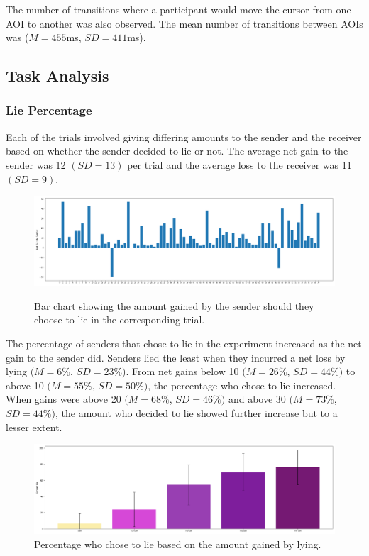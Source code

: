 \documentclass[man, floatsintext]{apa7}
\begin{document}
The number of transitions where a participant would move the cursor from one AOI to another was also observed. The mean number of transitions between AOIs was ($M = 455$ms, $SD = 411$ms).


\subsection{Task Analysis}

\subsubsection{Lie Percentage}

Each of the trials involved giving differing amounts to the sender and the receiver based on whether the sender decided to lie or not. The average net gain to the sender was 12 $(SD = 13)$ per trial and the average loss to the receiver was 11 $(SD = 9)$.

\begin{figure}[H]
	\caption{Bar chart showing the amount gained by the sender should they choose to lie in the corresponding trial.}
	\includegraphics[width=\linewidth]{../plots/TrialIndex/Gains.png}
	\label{fig:Gains}
\end{figure}

The percentage of senders that chose to lie in the experiment increased as the net gain to the sender did.  Senders lied the least when they incurred a net loss by lying $(M = 6\%$, $SD = 23\%)$. From net gains below 10 $(M = 26\%$, $SD = 44\%)$ to above 10 $(M = 55\%$, $SD = 50\%)$, the percentage who chose to lie increased. When gains were above 20 $(M = 68\%$, $SD = 46\%)$ and above 30 $(M = 73\%$, $SD = 44\%)$, the amount who decided to lie showed further increase but to a lesser extent.

\begin{figure}[H]
	\includegraphics[width=\linewidth]{../plots/RESPONSE/NetGainLie.png}
	\caption{Percentage who chose to lie based on the amount gained by lying.}
	\label{fig:NetGainLie}
\end{figure}
\end{document}
